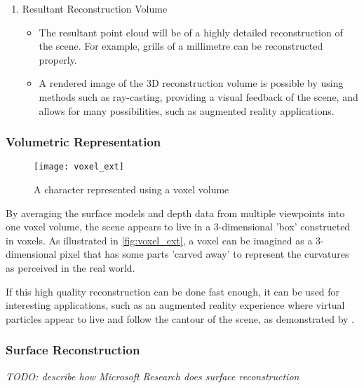 \begin{enumerate}
  \item Resultant Reconstruction Volume
    \begin{itemize}
      \item The resultant point cloud will be of a highly detailed reconstruction of the scene. For example, grills of a millimetre \cite{ms-3d-paper} can be reconstructed properly.
      \item A rendered image of the 3D reconstruction volume is possible by using methods such as ray-casting, providing a visual feedback of the scene, and allows for many possibilities, such as augmented reality applications.
    \end{itemize}
\end{enumerate}


\subsubsection{Volumetric Representation}

\begin{figure}[h]
  \centering
  \texttt{[image: voxel\_ext]}
  \caption[caption]{A character represented using a voxel volume\protect\footnotemark}
  \label{fig:voxel_ext}
\end{figure}

By averaging the surface models and depth data from multiple viewpoints into one voxel volume, the scene appears to live in a 3-dimensional 'box' constructed in voxels. As illustrated in \autoref{fig:voxel_ext}, a voxel can be imagined as a 3-dimensional pixel that has some parts 'carved away' to represent the curvatures as perceived in the real world.\cite{szeliski-book}

If this high quality reconstruction can be done fast enough, it can be used for interesting applications, such as an augmented reality experience where virtual particles appear to live and follow the cantour of the scene, as demonstrated by . 

\subsubsection{Surface Reconstruction} 
\textit{TODO: describe how Microsoft Research \cite{ms-surface-paper} does surface reconstruction}

